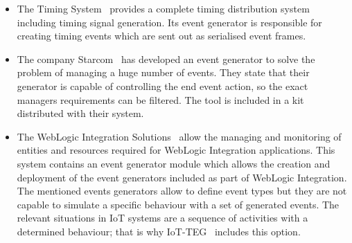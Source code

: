 \documentclass[review]{elsarticle}
\begin{document}
\begin{itemize}
 \item The Timing System~\cite{Finland:2016} provides a complete timing distribution system including timing signal 
 generation. Its event generator is responsible for creating timing events which are sent out as serialised event frames.
 \item The company Starcom~\cite{Starcom:2016} has developed an event generator to solve the problem of managing a huge 
 number of events. They state that their generator is capable of controlling the end event action, so the exact managers 
 requirements can be filtered. The tool is included in a kit distributed with their system.
 \item The WebLogic Integration Solutions~\cite{WebLogic:2016} allow the managing and monitoring of entities and 
 resources required for WebLogic Integration applications. This system contains an event generator module which allows the 
 creation and deployment of the event generators included as part of WebLogic Integration. The mentioned events 
 generators allow to define event types but they are not capable to simulate a specific behaviour with a set of 
 generated events. The relevant situations in IoT systems are a sequence of activities with a determined behaviour; 
 that is why IoT-TEG~\cite{TesisGutierrez2017,Gutierrez2017} includes this option.
\end{itemize}
\end{document}

